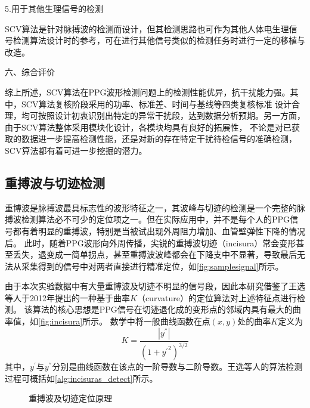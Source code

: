 5.用于其他生理信号的检测

SCV算法是针对脉搏波的检测而设计，但其检测思路也可作为其他人体电生理信号检测算法设计时的参考，可在进行其他信号类似的检测任务时进行一定的移植与改造。

六、综合评价

综上所述，SCV算法在PPG波形检测问题上的检测性能优异，抗干扰能力强。其中，SCV算法复核阶段采用的功率、标准差、时间与基线等四类复核标准
设计合理，均可按照设计初衷识别出特定的异常干扰段，达到数据分析预期。另一方面，由于SCV算法整体采用模块化设计，各模块均具有良好的拓展性，
不论是对已获取的数据进一步提高检测性能，还是对新的存在特定干扰待检信号的准确检测，SCV算法都有着可进一步挖掘的潜力。

\subsection{重搏波与切迹检测}
重博波是脉搏波最具标志性的波形特征之一，其波峰与切迹的检测是一个完整的脉搏波检测算法必不可少的定位项之一\cite{Wang2012}。但在实际应用中，并不是每个人的PPG信号都有着明显的重搏波，特别是当被试出现外周阻力增加、血管壁弹性下降的情况后\cite{mmt}。
此时，随着PPG波形向外周传播，尖锐的重搏波切迹（incisura）常会变形甚至丢失，退变成一简单拐点，甚至重搏波波峰都会在下降支中不显著，导致最后无法从采集得到的信号中对两者直接进行精准定位，如\autoref{fig:samplesignal}所示。

由于本次实验数据中有大量重博波及切迹不明显的信号段，因此本研究借鉴了王选等人于2012年提出的一种基于曲率$K$（curvature）的定位算法对上述特征点进行检测\cite{Wang2012}。
该算法的核心思想是PPG信号在切迹退化成的变形点的邻域内具有最大的曲率值，如\autoref{fig:incisura}所示。
数学中将一般曲线函数在点$(x,y)$处的曲率$K$定义为
\begin{equation}
    \label{equ:curvature}
    K=\frac{|y^{''}|}{{(1+{y^{'}}^2)}^{3/2}}
\end{equation}
其中，$y^{'}$与$y^{''}$分别是曲线函数在该点的一阶导数与二阶导数。王选等人的算法检测过程可概括如\autoref{alg:incisuras_detect}所示\cite{Wang2012}。
\begin{figure}[htbp]
    \centering
    \quad
    \caption[重搏波及切迹定位原理]{\label{fig:incisura}重搏波及切迹定位原理\cite{Wang2012,Su2014}}
\end{figure}

